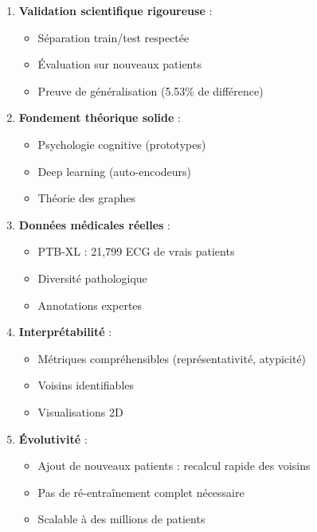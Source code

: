 \documentclass[12pt,a4paper]{article}
\begin{document}
\begin{enumerate}
    \item \textbf{Validation scientifique rigoureuse} :
    \begin{itemize}
        \item Séparation train/test respectée
        \item Évaluation sur nouveaux patients
        \item Preuve de généralisation (5.53\% de différence)
    \end{itemize}

    \item \textbf{Fondement théorique solide} :
    \begin{itemize}
        \item Psychologie cognitive (prototypes)
        \item Deep learning (auto-encodeurs)
        \item Théorie des graphes
    \end{itemize}

    \item \textbf{Données médicales réelles} :
    \begin{itemize}
        \item PTB-XL : 21,799 ECG de vrais patients
        \item Diversité pathologique
        \item Annotations expertes
    \end{itemize}

    \item \textbf{Interprétabilité} :
    \begin{itemize}
        \item Métriques compréhensibles (représentativité, atypicité)
        \item Voisins identifiables
        \item Visualisations 2D
    \end{itemize}

    \item \textbf{Évolutivité} :
    \begin{itemize}
        \item Ajout de nouveaux patients : recalcul rapide des voisins
        \item Pas de ré-entraînement complet nécessaire
        \item Scalable à des millions de patients
    \end{itemize}
\end{enumerate}
\end{document}
